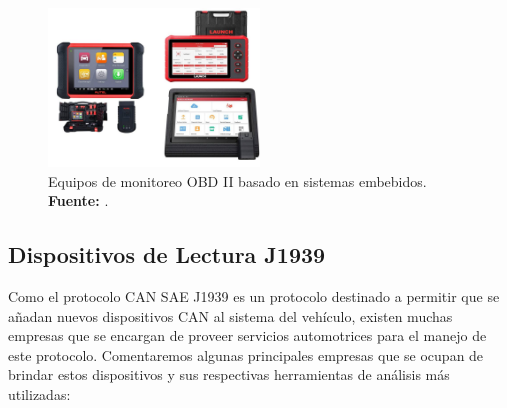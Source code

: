 \begin{itemize}
	
	
	
	
	
	\begin{figure}[H]
		\centering
		\includegraphics[width=0.5\textwidth]{./Cap3imagen/embebidos.JPG}
		\caption[Equipos de monitoreo OBD II basado en sistemas embebidos.]{Equipos de monitoreo OBD II basado en sistemas embebidos.\textbf{ Fuente:} \cite{cite_obd0_c3}.}
		\label{fig_obd3_c3} %
	\end{figure}
	
	
	
\end{itemize}


\subsection{Dispositivos de Lectura J1939}
Como el protocolo CAN SAE J1939 es un protocolo destinado a permitir que se añadan nuevos dispositivos CAN al sistema del vehículo, existen muchas empresas que se encargan de proveer servicios automotrices para el manejo de este protocolo. Comentaremos algunas principales empresas que se ocupan de brindar estos dispositivos y sus respectivas herramientas de análisis más utilizadas:  


